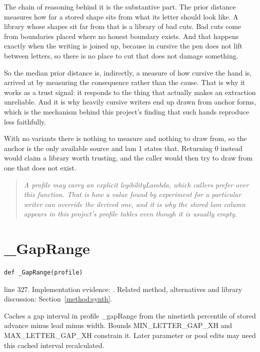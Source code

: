 The chain of reasoning behind it is the substantive part. The prior distance measures how far a stored shape sits from what its letter should look like. A library whose shapes sit far from that is a library of bad cuts. Bad cuts come from boundaries placed where no honest boundary exists. And that happens exactly when the writing is joined up, because in cursive the pen does not lift between letters, so there is no place to cut that does not damage something.

So the median prior distance is, indirectly, a measure of how cursive the hand is, arrived at by measuring the consequence rather than the cause. That is why it works as a trust signal: it responds to the thing that actually makes an extraction unreliable. And it is why heavily cursive writers end up drawn from anchor forms, which is the mechanism behind this project's finding that such hands reproduce less faithfully.


With no variants there is nothing to measure and nothing to draw from, so the anchor is the only available source and lam 1 states that. Returning 0 instead would claim a library worth trusting, and the caller would then try to draw from one that does not exist.


\begin{quote}\small\itshape A profile may carry an explicit legibilityLambda, which callers prefer over this function. That is how a value found by experiment for a particular writer can override the derived one, and it is why the stored lam column appears in this project's profile tables even though it is usually empty.\end{quote}


\section{\_GapRange}\label{fn:synthesise:-GapRange}
\begin{lstlisting}[style=sig]
def _GapRange(profile)
\end{lstlisting}
 line 327. Implementation evidence: \cite{code2026}. Related method, alternatives and library discussion: Section~\ref{method:synth}.


Caches a gap interval in profile \_gapRange from the ninetieth percentile of stored advance minus lead minus width. Bounds MIN\_LETTER\_GAP\_XH and MAX\_LETTER\_GAP\_XH constrain it. Later parameter or pool edits may need this cached interval recalculated.



